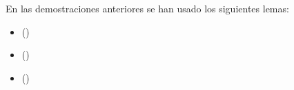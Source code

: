 \begin{isabellebody}
%
\isadelimproof
%
\endisadelimproof
%
\begin{isamarkuptext}%
En las demostraciones anteriores se han usado los siguientes
 lemas:
  \begin{itemize}
    \item[]  
      \hfill ()
  \end{itemize} 
  \begin{itemize}
    \item[]  
      \hfill ()
  \end{itemize} 
  \begin{itemize}
    \item[]  
      \hfill ()
  \end{itemize} 


\end{isamarkuptext}
\end{isabellebody}
